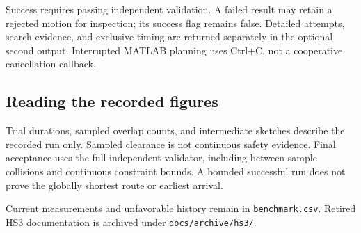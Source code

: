 Success requires passing independent validation. A failed result may retain a
rejected motion for inspection; its success flag remains false. Detailed attempts,
search evidence, and exclusive timing are returned separately in the optional
second output. Interrupted MATLAB planning uses Ctrl+C, not a cooperative
cancellation callback.


\subsection{Reading the recorded figures}

Trial durations, sampled overlap counts, and intermediate sketches describe the
recorded run only. Sampled clearance is not continuous safety evidence.
Final acceptance uses the full independent validator, including between-sample
collisions and continuous constraint bounds. A bounded successful run does not
prove the globally shortest route or earliest arrival.

Current measurements and unfavorable history remain in \texttt{benchmark.csv}.
Retired HS3 documentation is archived under \texttt{docs/archive/hs3/}.
